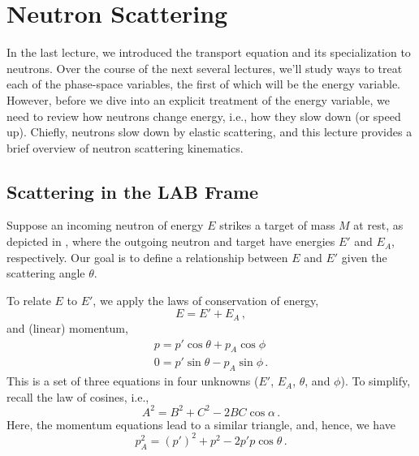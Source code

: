 \chapter{Neutron Scattering}

In the last lecture, we introduced the transport equation and 
its specialization to neutrons.  Over the course of the next several
lectures, we'll study ways to treat each of the phase-space 
variables, the first of which will be the energy variable.  However,
before we dive into an explicit treatment 
of the energy variable, we need to review how neutrons
change energy, i.e., how they slow down (or speed up).  Chiefly, neutrons 
slow down by elastic scattering, and this 
lecture provides a brief overview
of neutron scattering kinematics.

\section*{Scattering in the LAB Frame}

Suppose an incoming neutron of energy $E$ strikes a target of mass
$M$ at rest, as depicted in , where 
the outgoing neutron and target have energies $E'$ and $E_A$, 
respectively.  Our goal is to define a relationship between 
$E$ and $E'$ given the scattering angle $\theta$.

To relate $E$ to $E'$, we apply the laws of conservation of energy,
\begin{equation}
  E = E' + E_A \, ,
\label{eq:conservation_energy}
\end{equation}
and (linear) momentum,
\begin{equation}
\begin{split}
 p = p' \cos \theta  + p_A \cos \phi \\
 0 = p' \sin \theta  - p_A \sin \phi \, .
\end{split}
\end{equation}
This is a set of three equations in four unknowns ($E'$, $E_A$, 
$\theta$, and $\phi$).  To simplify, recall the law of 
cosines, i.e.,
\begin{equation}
  A^2 = B^2 + C^2 - 2BC\cos \alpha \, .
\end{equation}
Here, the momentum equations lead to a similar triangle, and, hence,
we have
\begin{equation}
  p_A^2 = (p')^2 + p^2 - 2p'p \cos \theta \, .
\end{equation}

